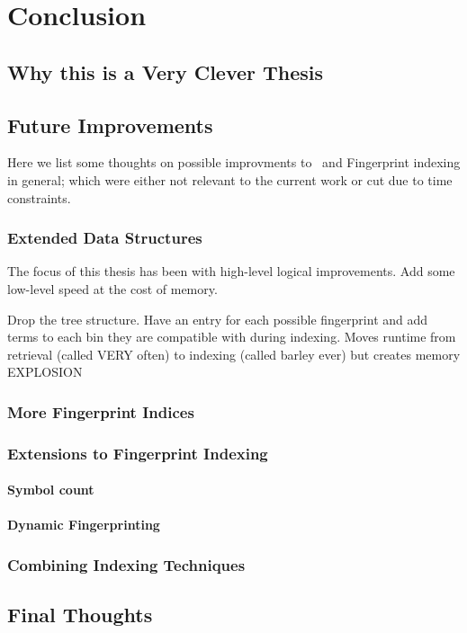 
\chapter{Conclusion}
\label{cha:conclusion}

\section{Why this is a Very Clever Thesis}
\label{sec:why}

\section{Future Improvements}
\label{sec:future}

Here we list some thoughts on possible improvments to \beagle\ and Fingerprint
indexing in general; which were either not relevant to the current work or
cut due to time constraints.

\subsection{Extended Data Structures}
The focus of this thesis has been with high-level logical improvements.
Add some low-level speed at the cost of memory.

Drop the tree structure. Have an entry for each possible fingerprint and add terms
to each bin they are compatible with during indexing. Moves runtime from
retrieval (called VERY often) to indexing (called barley ever) but creates memory
EXPLOSION

\subsection{More Fingerprint Indices}

\subsection{Extensions to Fingerprint Indexing}

\subsubsection{Symbol count}
\subsubsection{Dynamic Fingerprinting}

\subsection{Combining Indexing Techniques}

\section{Final Thoughts}

